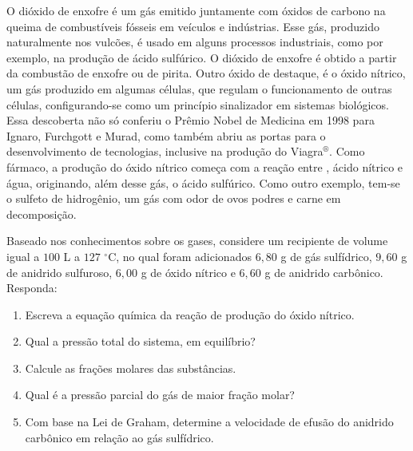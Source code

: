 O dióxido de enxofre é um gás emitido juntamente com óxidos de carbono na queima de combustíveis fósseis em veículos e indústrias.
Esse gás, produzido naturalmente nos vulcões, é usado em alguns processos industriais, como por exemplo, na produção de ácido sulfúrico.
O dióxido de enxofre é obtido a partir da combustão de enxofre ou de pirita.
Outro óxido de destaque, é o óxido nítrico, um gás produzido em algumas células, que regulam o funcionamento de outras células, configurando-se como um princípio sinalizador em sistemas biológicos.
Essa descoberta não só conferiu o Prêmio Nobel de Medicina em 1998 para Ignaro, Furchgott e Murad, como também abriu as portas para o desenvolvimento de tecnologias, inclusive na produção do Viagra$^\text{®}$.
Como fármaco, a produção do óxido nítrico começa com a reação entre , ácido nítrico e água, originando, além desse gás, o ácido sulfúrico.
Como outro exemplo, tem-se o sulfeto de hidrogênio, um gás com odor de ovos podres e carne em decomposição.

Baseado nos conhecimentos sobre os gases, considere um recipiente de volume igual a $100$ L a $127$ $^\circ$C, no qual foram adicionados $6,80$ g de gás sulfídrico, $9,60$ g de anidrido sulfuroso, $6,00$ g de óxido nítrico e $6,60$ g de anidrido carbônico. Responda: 

\begin{enumerate}[label = (\alph*)]
	\item Escreva a equação química da reação de produção do óxido nítrico. 
	\item Qual a pressão total do sistema, em equilíbrio? 
	\item Calcule as frações molares das substâncias.
	\item Qual é a pressão parcial do gás de maior fração molar? 
	\item Com base na Lei de Graham, determine a velocidade de efusão do anidrido carbônico em relação ao gás sulfídrico.
\end{enumerate}
